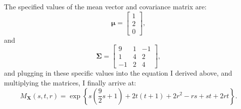 \begin{problem}{16}
The specified values of the mean vector and covariance matrix are:
\begin{equation*}
 \bm \mu = \left[\begin{matrix}
    1\\
    2 \\
    0
\end{matrix}\right],
\end{equation*}
and 
\begin{equation*}
\bm \Sigma = \left[\begin{matrix}
    9& 1 &-1 \\
    1& 4 & 2 \\
    -1& 2 &4
\end{matrix}\right],
\end{equation*}
and plugging in these specific values into the equation I derived above, and multiplying the matrices, I finally arrive at:
\begin{equation*}
M_{\bm X}(s, t, r) = \exp \left \{ s\left (\frac{9}{2}s+1 \right)+2t(t+1)+2r^2-rs+st+2rt \right \}.
\end{equation*}

\end{problem}

